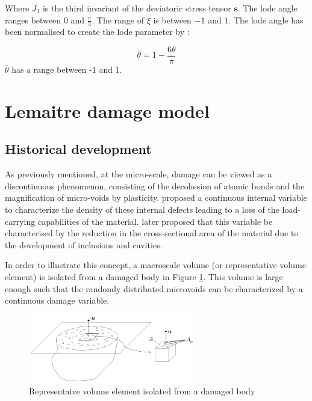 \documentclass[sn-mathphys,Numbered,draft]{sn-jnl}%
\begin{document}
Where $J_3$ is the third invariant of the deviatoric stress tensor $\mathbf{s}$. The lode angle ranges between $0$ and $\frac{\pi}{3}$. The range of $\xi$ is between $-1$ and $1$. The lode angle has been normalised to create the lode parameter by \citet{bai_new_2008}:

\begin{equation}
	\bar{\theta}=1-\frac{6\theta}{\pi}	
\end{equation}
$\bar{\theta}$ has a range between -1 and 1.

\section{Lemaitre damage model}

\subsection{Historical development}
As previously mentioned, at the micro-scale, damage can be viewed as a discontinuous phenomenon, consisting of the decohesion of atomic bonds and the magnification of micro-voids by plasticity. \citet{kachanov_time_1958} proposed a continuous internal variable to characterize the density of these internal defects leading to a loss of the load-carrying capabilities of the material. \citet{rabotnov_paper_1963} later proposed that this variable be characterised by the reduction in the cross-sectional area of the material due to the development of inclusions and cavities.

In order to illustrate this concept, a macroscale volume (or representative volume element) is isolated from a damaged body in Figure \ref{fig:RVEDamage}. This volume is large enough such that the randomly distributed microvoids can be characterized by a continuous damage variable.

\begin{figure}[htb]
\begin{center}
	\includegraphics[width=0.65\textwidth]{./Figures/damageModels/damageVolume.png}
\caption{Representaive volume element isolated from a damaged body \cite{voyiadjis_damage_2005}}
\label{fig:RVEDamage}
\end{center}
\end{figure}
\end{document}
